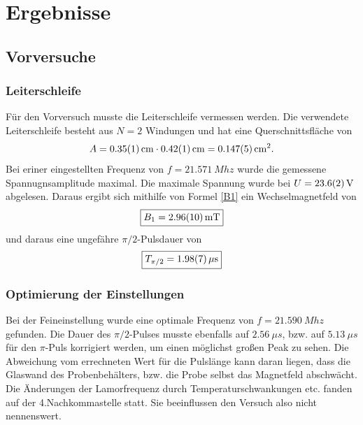 \documentclass[12pt,a4paper]{article}
\begin{document}
\section{Ergebnisse}

\subsection{Vorversuche}

\subsubsection{Leiterschleife}

Für den Vorversuch musste die Leiterschleife vermessen werden. Die verwendete Leiterschleife besteht aus $N=2$ Windungen und hat eine Querschnittsfläche von 
\begin{equation*}
A =  \SI{0.35\pm 0.01}{cm} \cdot \SI{0.42\pm 0.01}{cm} = \SI{0.147\pm 0.005}{cm^2}.
\end{equation*}
Bei eriner eingestellten Frequenz von $f = \SI{21.571}{Mhz}$ wurde die gemessene Spannugnsamplitude maximal. Die maximale Spannung wurde bei $U =\SI{23.6\pm 0.2}{V}$ abgelesen. Daraus ergibt sich mithilfe von Formel \ref{B1} ein Wechselmagnetfeld von 
\begin{equation*}
\boxed{B_1 = \SI{2.96\pm 0.10}{mT}}
\end{equation*}
und daraus eine ungefähre $\pi /2$-Pulsdauer von
\begin{equation*}
\boxed{T_{\pi /2} = \SI{1.98\pm 0.07}{\mu s}}
\end{equation*}
\subsubsection{Optimierung der Einstellungen}
Bei der Feineinstellung wurde eine optimale Frequenz von  $f = \SI{21.590}{Mhz}$ gefunden. Die Dauer des $\pi / 2 $-Pulses musste ebenfalls auf $\SI{2.56}{\mu s}$, bzw. auf $\SI{5.13}{\mu s}$ für den $\pi$-Puls korrigiert werden, um einen möglichst großen Peak zu sehen. Die Abweichung vom errechneten Wert für die Pulslänge kann daran liegen, dass die Glaswand des Probenbehälters, bzw. die Probe selbst das Magnetfeld abschwächt.\\
Die Änderungen der Lamorfrequenz durch Temperaturschwankungen etc. fanden auf der 4.Nachkommastelle statt. Sie beeinflussen den Versuch also nicht nennenswert.
\end{document}
